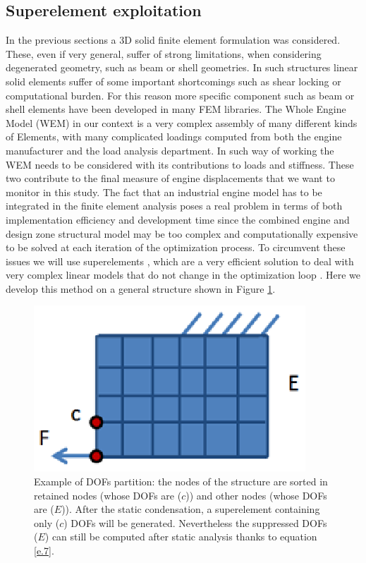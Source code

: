 \subsection{Superelement exploitation}
\label{subsection1.4.1}
In the previous sections a 3D solid finite element formulation was considered. These, even if very general, suffer of strong limitations, when considering degenerated geometry, such as beam or shell geometries. In such structures linear solid elements suffer of some important shortcomings such as shear locking or computational burden. For this reason more specific component such as beam or shell elements have been developed in many FEM libraries. The Whole Engine Model (WEM) in our context is a very complex assembly of many different kinds of Elements, with many complicated loadings computed from both the engine manufacturer and the load analysis department. In such way of working the WEM needs to be considered with its contributions to loads and stiffness. These two contribute to the final measure of engine displacements that we want to monitor in this study.  The fact that an industrial engine model has to be integrated in the finite element analysis poses a real problem in terms of both implementation efficiency and development time since the combined engine and design zone structural model may be too complex and computationally expensive to be solved at each iteration of the optimization process. To circumvent these issues we will use superelements \cite{nastran2013superelements}, which are a very efficient solution to deal with very complex linear models that do not change in the optimization loop \cite{krog2004topology}.
Here we develop this method on a general structure shown in Figure \ref{f.3}.
\begin{figure}[hbt!]
\centering
\includegraphics[width=.4\textwidth]{images/Ch1/dof_part.eps}
\caption{Example of DOFs partition: the nodes of the structure are sorted in retained nodes (whose DOFs are ($c$)) and other nodes (whose  DOFs are ($E$)). After the static condensation, a superelement containing only ($c$) DOFs will be generated. Nevertheless the suppressed DOFs ($E$) can still be computed after static analysis thanks to equation \ref{e.7}.  \label{f.3}}
\end{figure}
